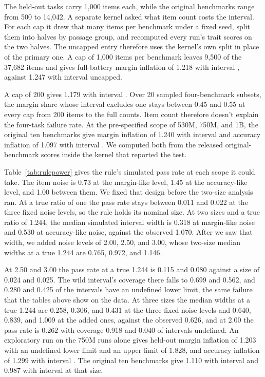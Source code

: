 The held-out tasks carry 1,000 items each, while the original benchmarks range from 500 to 14,042. A separate kernel asked what item count costs the interval. For each cap it drew that many items per benchmark under a fixed seed, split them into halves by passage group, and recomputed every run's trait scores on the two halves. The uncapped entry therefore uses the kernel's own split in place of the primary one. A cap of 1,000 items per benchmark leaves 9,500 of the 37,682 items and gives full-battery margin inflation of 1.218 with interval , against 1.247 with interval  uncapped.

A cap of 200 gives 1.179 with interval . Over 20 sampled four-benchmark subsets, the margin share whose interval excludes one stays between 0.45 and 0.55 at every cap from 200 items to the full counts. Item count therefore doesn't explain the four-task failure rate. At the pre-specified scope of 530M, 750M, and 1B, the original ten benchmarks give margin inflation of 1.240 with interval  and accuracy inflation of 1.097 with interval . We computed both from the released original-benchmark scores inside the kernel that reported the test.

Table~\ref{tab:rulepower} gives the rule's simulated pass rate at each scope it could take. The item noise is 0.73 at the margin-like level, 1.45 at the accuracy-like level, and 1.00 between them. We fixed that design before the two-size analysis ran. At a true ratio of one the pass rate stays between 0.011 and 0.022 at the three fixed noise levels, so the rule holds its nominal size. At two sizes and a true ratio of 1.244, the median simulated interval width is 0.318 at margin-like noise and 0.530 at accuracy-like noise, against the observed 1.070. After we saw that width, we added noise levels of 2.00, 2.50, and 3.00, whose two-size median widths at a true 1.244 are 0.765, 0.972, and 1.146.

At 2.50 and 3.00 the pass rate at a true 1.244 is 0.115 and 0.080 against a size of 0.024 and 0.025. The wild interval's coverage there falls to 0.699 and 0.562, and 0.280 and 0.425 of the intervals have an undefined lower limit, the same failure that the tables above show on the data. At three sizes the median widths at a true 1.244 are 0.258, 0.306, and 0.431 at the three fixed noise levels and 0.640, 0.839, and 1.009 at the added ones, against the observed 0.626, and at 2.00 the pass rate is 0.262 with coverage 0.918 and 0.040 of intervals undefined. An exploratory run on the 750M runs alone gives held-out margin inflation of 1.203 with an undefined lower limit and an upper limit of 1.828, and accuracy inflation of 1.299 with interval . The original ten benchmarks give 1.110 with interval  and 0.987 with interval  at that size.

